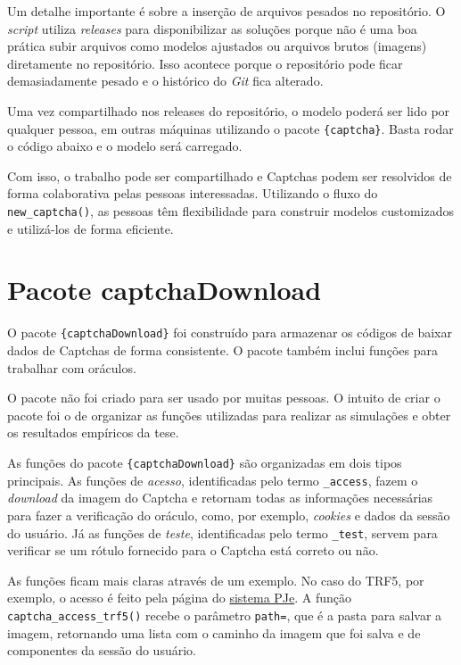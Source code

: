 \documentclass[12pt,twoside,brazilian]{book}
\begin{document}
Um detalhe importante é sobre a inserção de arquivos pesados no
repositório. O \emph{script} utiliza \emph{releases} para disponibilizar
as soluções porque não é uma boa prática subir arquivos como modelos
ajustados ou arquivos brutos (imagens) diretamente no repositório. Isso
acontece porque o repositório pode ficar demasiadamente pesado e o
histórico do \emph{Git} fica alterado.

Uma vez compartilhado nos releases do repositório, o modelo poderá ser
lido por qualquer pessoa, em outras máquinas utilizando o pacote
\texttt{\{captcha\}}. Basta rodar o código abaixo e o modelo será
carregado.

Com isso, o trabalho pode ser compartilhado e Captchas podem ser
resolvidos de forma colaborativa pelas pessoas interessadas. Utilizando
o fluxo do \texttt{new\_captcha()}, as pessoas têm flexibilidade para
construir modelos customizados e utilizá-los de forma eficiente.

\hypertarget{sec-pacote-download}{%
\section{Pacote captchaDownload}\label{sec-pacote-download}}

O pacote \texttt{\{captchaDownload\}} foi construído para armazenar os
códigos de baixar dados de Captchas de forma consistente. O pacote
também inclui funções para trabalhar com oráculos.

O pacote não foi criado para ser usado por muitas pessoas. O intuito de
criar o pacote foi o de organizar as funções utilizadas para realizar as
simulações e obter os resultados empíricos da tese.

As funções do pacote \texttt{\{captchaDownload\}} são organizadas em
dois tipos principais. As funções de \emph{acesso}, identificadas pelo
termo \texttt{\_access}, fazem o \emph{download} da imagem do Captcha e
retornam todas as informações necessárias para fazer a verificação do
oráculo, como, por exemplo, \emph{cookies} e dados da sessão do usuário.
Já as funções de \emph{teste}, identificadas pelo termo \texttt{\_test},
servem para verificar se um rótulo fornecido para o Captcha está correto
ou não.

As funções ficam mais claras através de um exemplo. No caso do TRF5, por
exemplo, o acesso é feito pela página do
\href{https://pje.trf5.jus.br/pjeconsulta/ConsultaPublica/listView.seam}{sistema
PJe}. A função \texttt{captcha\_access\_trf5()} recebe o parâmetro
\texttt{path=}, que é a pasta para salvar a imagem, retornando uma lista
com o caminho da imagem que foi salva e de componentes da sessão do
usuário.
\end{document}
